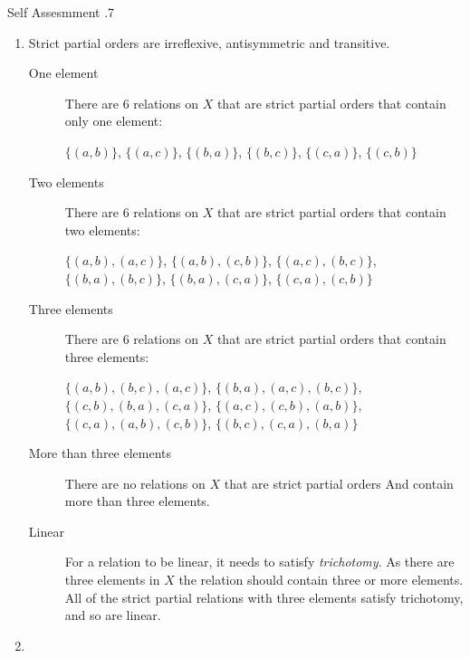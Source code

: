 \documentclass[../notes.tex]{subfiles}
\begin{document}
				\begin{exercise}{Self Assesmment \thechapter.7}
					\begin{enumerate}
						\item {}
							Strict partial orders are irreflexive, antisymmetric and transitive.
							\begin{description}
								\item[One element] There are $6$ relations on $X$ that are strict partial orders that contain only one element:
									\begin{center}
										$ \bigl\{(a, b)\bigr\}$, $\bigl\{(a, c)\bigr\}$, $\bigl\{(b, a)\bigr\}$, $\bigl\{(b, c)\bigr\}$, $\bigl\{(c, a)\bigr\}$, $\bigl\{(c, b)\bigr\}$
									\end{center}
								\item[Two elements] There are $6$ relations on $X$ that are strict partial orders that contain two elements:
									\begin{center}
										$ \bigl\{(a, b), (a, c)\bigr\}$, $ \bigl\{(a, b), (c, b)\bigr\}$, $ \bigl\{(a, c), (b, c)\bigr\}$, $ \bigl\{(b, a), (b, c)\bigr\}$, $ \bigl\{(b, a), (c, a)\bigr\}$, $\bigl\{(c, a), (c, b)\bigr\}$
									\end{center}
								\tcbbreak
								\item[Three elements] There are $6$ relations on $X$ that are strict partial orders that contain three elements:
									\begin{center}
										$\bigl\{(a, b), (b, c), (a, c)\bigr\}$, $\bigl\{(b, a), (a, c), (b, c)\bigr\}$, $\bigl\{(c, b), (b, a), (c, a)\bigr\}$, $\bigl\{(a, c), (c, b), (a, b)\bigr\}$, $\bigl\{(c, a), (a, b), (c, b)\bigr\}$, $\bigl\{(b, c), (c, a), (b, a)\bigr\}$
									\end{center}
								\item[More than three elements] There are no relations on $X$ that are strict partial orders And contain more than three elements.
								\item[Linear] For a relation to be linear, it needs to satisfy \emph{trichotomy}. As there are three elements in $X$ the relation should contain three or more elements.\\
									All of the strict partial relations with three elements satisfy trichotomy, and so are linear. 
							\end{description}
						\item {}

\end{enumerate}
\end{exercise}
\end{document}
